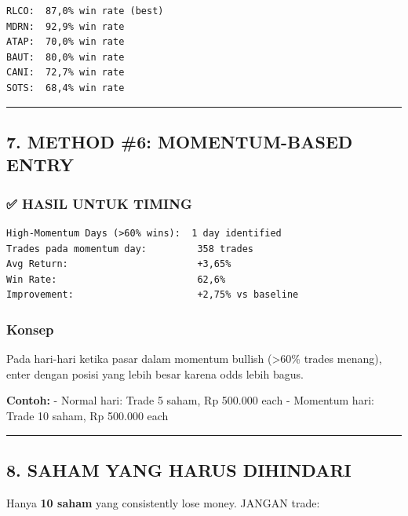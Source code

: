 \documentclass[
  10pt,
  a4paper,
]{article}
\begin{document}
\begin{verbatim}
RLCO:  87,0% win rate (best)
MDRN:  92,9% win rate
ATAP:  70,0% win rate
BAUT:  80,0% win rate
CANI:  72,7% win rate
SOTS:  68,4% win rate
\end{verbatim}

\begin{center}\rule{0.5\linewidth}{0.5pt}\end{center}

\subsection{7. METHOD \#6: MOMENTUM-BASED
ENTRY}\label{method-6-momentum-based-entry}

\subsubsection{✅ HASIL UNTUK TIMING}\label{hasil-untuk-timing}

\begin{verbatim}
High-Momentum Days (>60% wins):  1 day identified
Trades pada momentum day:         358 trades
Avg Return:                       +3,65%
Win Rate:                         62,6%
Improvement:                      +2,75% vs baseline
\end{verbatim}

\subsubsection{Konsep}\label{konsep}

Pada hari-hari ketika pasar dalam momentum bullish (\textgreater60\%
trades menang), enter dengan posisi yang lebih besar karena odds lebih
bagus.

\textbf{Contoh:} - Normal hari: Trade 5 saham, Rp 500.000 each -
Momentum hari: Trade 10 saham, Rp 500.000 each

\begin{center}\rule{0.5\linewidth}{0.5pt}\end{center}

\subsection{8. SAHAM YANG HARUS
DIHINDARI}\label{saham-yang-harus-dihindari}

Hanya \textbf{10 saham} yang consistently lose money. JANGAN trade:
\end{document}
